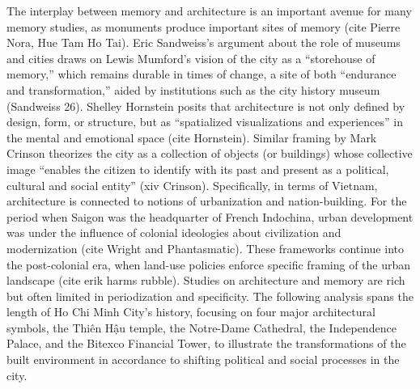 The interplay between memory and architecture is an important avenue for many memory studies, as monuments produce important sites of memory (cite Pierre Nora, Hue Tam Ho Tai). Eric Sandweiss’s argument about the role of museums and cities draws on Lewis Mumford’s vision of the city as a “storehouse of memory,” which remains durable in times of change, a site of both “endurance and transformation,” aided by institutions such as the city history museum (Sandweiss 26). Shelley Hornstein posits that architecture is not only defined by design, form, or structure, but as “spatialized visualizations and experiences” in the mental and emotional space (cite Hornstein). Similar framing by Mark Crinson theorizes the city as a collection of objects (or buildings) whose collective image “enables the citizen to identify with its past and present as a political, cultural and social entity” (xiv Crinson). Specifically, in terms of Vietnam, architecture is connected to notions of urbanization and nation-building. For the period when Saigon was the headquarter of French Indochina, urban development was under the influence of colonial ideologies about civilization and modernization (cite Wright and Phantasmatic). These frameworks continue into the post-colonial era, when land-use policies enforce specific framing of the urban landscape (cite erik harms rubble). Studies on architecture and memory are rich but often limited in periodization and specificity. The following analysis spans the length of Ho Chi Minh City’s history, focusing on four major architectural symbols, the Thiên Hậu temple, the Notre-Dame Cathedral, the Independence Palace, and the Bitexco Financial Tower, to illustrate the transformations of the built environment in accordance to shifting political and social processes in the city.

